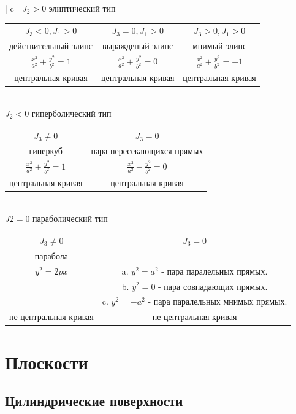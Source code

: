 \documentclass[12pt, a4paper]{article}
\begin{document}
\begin{tabular}{| c |}
	\hline\hline 
	$J_2 > 0$ элиптический тип \\ 
	\hline
	\begin{tabular}{c | c | c}
		$J_3<0,J_1>0$ & $J_3=0,J_1>0$ & $J_3>0,J_1>0$\\
		действительный элипс& выражденый элипс & мнимый элипс\\
		$ \frac{x^2}{a^2} + \frac{y^2}{b^2} = 1$ & $ \frac{x^2}{a^2} + \frac{y^2}{b^2} = 0$ & $ \frac{x^2}{a^2} + \frac{y^2}{b^2} = -1$\\
		центральная кривая & центральная кривая & центральная кривая
	\end{tabular}\\

	\hline\hline 
	$J_2 < 0$ гиперболический тип \\
	\hline
	\begin{tabular}{c | c}
		$J_3\not=0$ & $J_3=0$ \\
		гиперкуб & пара пересекающихся прямых \\
		$ \frac{x^2}{a^2} + \frac{y^2}{b^2} = 1$ & $\frac{x^2}{a^2} - \frac{y^2}{b^2} = 0$\\
		центральная кривая & центральная кривая
	\end{tabular}\\

	\hline\hline 
	$J2=0$ параболический тип \\
	\hline
	\begin{tabular}{c | c}
		$J_3\not=0$ & $J_3=0$ \\
		парабола & \\
		$ y^2 = 2px$ 
			 & 
		a. $y^2 = a^2$ - пара паралельных прямых.\\ &
		b. $y^2 = 0$ - пара совпадающих прямых.\\ &
			c. $y^2 = -a^2$ - пара паралельных мнимых прямых. \\
		не центральная кривая & не центральная кривая
	\end{tabular}
\end{tabular}

\section{Плоскости}
\subsection{Цилиндрические поверхности}
\setcounter{equation}{0}
\end{document}
